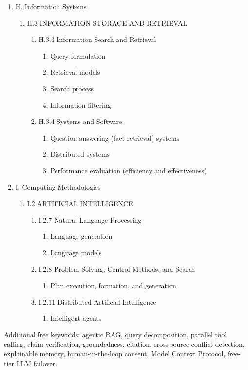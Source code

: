 \documentclass[oneside,a4paper,12pt]{report}
\begin{document}
\begin{enumerate}
	\item H. Information Systems
	\begin{enumerate}
		\item H.3 INFORMATION STORAGE AND RETRIEVAL
		\begin{enumerate}
			\item H.3.3 Information Search and Retrieval
			\begin{enumerate}
				\item Query formulation
				\item Retrieval models
				\item Search process
				\item Information filtering
			\end{enumerate}
			\item H.3.4 Systems and Software
			\begin{enumerate}
				\item Question-answering (fact retrieval) systems
				\item Distributed systems
				\item Performance evaluation (efficiency and effectiveness)
			\end{enumerate}
		\end{enumerate}
	\end{enumerate}
	\item I. Computing Methodologies
	\begin{enumerate}
		\item I.2 ARTIFICIAL INTELLIGENCE
		\begin{enumerate}
			\item I.2.7 Natural Language Processing
			\begin{enumerate}
				\item Language generation
				\item Language models
			\end{enumerate}
			\item I.2.8 Problem Solving, Control Methods, and Search
			\begin{enumerate}
				\item Plan execution, formation, and generation
			\end{enumerate}
			\item I.2.11 Distributed Artificial Intelligence
			\begin{enumerate}
				\item Intelligent agents
			\end{enumerate}
		\end{enumerate}
	\end{enumerate}
\end{enumerate}

Additional free keywords: agentic RAG, query decomposition, parallel tool calling, claim verification, groundedness, citation, cross-source conflict detection, explainable memory, human-in-the-loop consent, Model Context Protocol, free-tier LLM failover.
\end{document}
